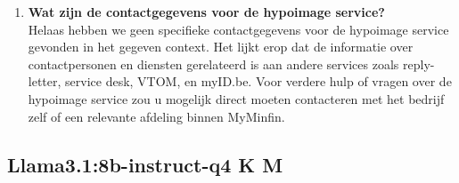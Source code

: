 \begin{enumerate}
    \item \textbf{Wat zijn de contactgegevens voor de hypoimage service?} \\
    Helaas hebben we geen specifieke contactgegevens voor de hypoimage service gevonden in het gegeven context. Het lijkt erop dat de informatie over contactpersonen en diensten gerelateerd is aan andere services zoals reply-letter, service desk, VTOM, en myID.be. Voor verdere hulp of vragen over de hypoimage service zou u mogelijk direct moeten contacteren met het bedrijf zelf of een relevante afdeling binnen MyMinfin.
    
\end{enumerate}

\subsection{Llama3.1:8b-instruct-q4 K M}
